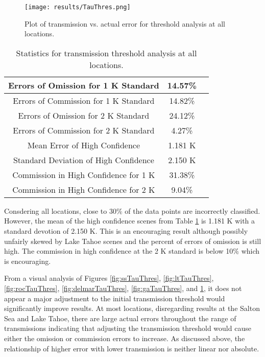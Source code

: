 \documentclass{book}
\begin{document}
\begin{minipage}[c]{0.47\textwidth}
\centering
\begin{figure}[H]
\texttt{[image: results/TauThres.png]}
\caption{Plot of transmission vs. actual error for threshold analysis at all locations.}
\label{fig:TauThres}
\end{figure}
\end{minipage}
\begin{minipage}[c]{0.47\textwidth}
\begin{table}[H]
\centering
\footnotesize
\begin{tabular}{ | c | c | c | } \hline
Errors of Omission for 1 K Standard & 14.57\% \\ \hline
Errors of Commission for 1 K Standard & 14.82\% \\ \hline
Errors of Omission for 2 K Standard & 24.12\% \\ \hline
Errors of Commission for 2 K Standard & 4.27\% \\ \hline
Mean Error of High Confidence & 1.181 K \\ \hline
Standard Deviation of High Confidence & 2.150 K \\ \hline
Commission in High Confidence for 1 K & 31.38\% \\ \hline
Commission in High Confidence for 2 K & 9.04\% \\ \hline
\end{tabular}
\caption{Statistics for transmission threshold analysis at all locations.}
\label{tab:TauThres}
\end{table}
\end{minipage}

Consdering all locations, close to 30\% of the data points are incorrectly classified.  However, the mean of the high confidence scenes  from Table \ref{tab:TauThres} is 1.181 K with a standard devotion of 2.150 K.  This is an encouraging result although possibly unfairly skewed by Lake Tahoe scenes and the percent of errors of omission is still high.  The commission in high confidence at the 2 K standard is below 10\% which is encouraging.

From a visual analysis of Figures \ref{fig:ssTauThres}, \ref{fig:ltTauThres}, \ref{fig:rocTauThres}, \ref{fig:delmarTauThres}, \ref{fig:gaTauThres}, and \ref{fig:TauThres}, it does not appear a major adjustment to the initial transmission threshold would significantly improve results.  At most locations, disregarding results at the Salton Sea and Lake Tahoe, there are large actual errors throughout the range of transmissions indicating that adjusting the transmission threshold would cause either the omission or commission errors to increase.  As discussed above, the relationship of higher error with lower transmission is neither linear nor absolute.
\end{document}
